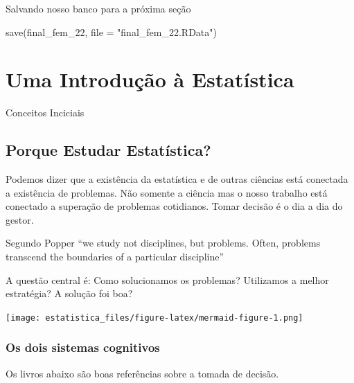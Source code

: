\documentclass[
  letterpaper,
  DIV=11,
  numbers=noendperiod]{scrreprt}
\newenvironment{Shaded}{\begin{snugshade}}{\end{snugshade}}
\newcommand{\AttributeTok}[1]{\textcolor[rgb]{0.40,0.45,0.13}{#1}}
\newcommand{\FunctionTok}[1]{\textcolor[rgb]{0.28,0.35,0.67}{#1}}
\newcommand{\NormalTok}[1]{\textcolor[rgb]{0.00,0.23,0.31}{#1}}
\newcommand{\StringTok}[1]{\textcolor[rgb]{0.13,0.47,0.30}{#1}}
\begin{document}
Salvando nosso banco para a próxima seção

\begin{Shaded}
\begin{Highlighting}[]
\FunctionTok{save}\NormalTok{(final\_fem\_22, }\AttributeTok{file =} \StringTok{"final\_fem\_22.RData"}\NormalTok{)}
\end{Highlighting}
\end{Shaded}


\chapter{Uma Introdução à
Estatística}\label{uma-introduuxe7uxe3o-uxe0-estatuxedstica}

Conceitos Inciciais

\hfill\break

\section{Porque Estudar
Estatística?}\label{porque-estudar-estatuxedstica}

Podemos dizer que a existência da estatística e de outras ciências está
conectada a existência de problemas. Não somente a ciência mas o nosso
trabalho está conectado a superação de problemas cotidianos. Tomar
decisão é o dia a dia do gestor.

Segundo Popper ``we study not disciplines, but problems. Often, problems
transcend the boundaries of a particular discipline''

A questão central é: Como solucionamos os problemas? Utilizamos a melhor
estratégia? A solução foi boa?

\texttt{[image: estatistica\_files/figure-latex/mermaid-figure-1.png]}

\subsection{Os dois sistemas
cognitivos}\label{os-dois-sistemas-cognitivos}

Os livros abaixo são boas referências sobre a tomada de decisão.
\end{document}
